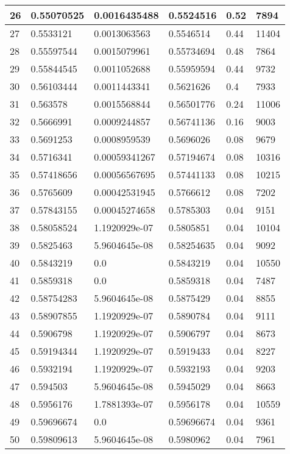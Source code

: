 \begin{longtable}{|l|l|l|l|l|l|}
26 & 0.55070525 & 0.0016435488 & 0.5524516 & 0.52 & 7894 \\ \hline 
27 & 0.5533121 & 0.0013063563 & 0.5546514 & 0.44 & 11404 \\ \hline 
28 & 0.55597544 & 0.0015079961 & 0.55734694 & 0.48 & 7864 \\ \hline 
29 & 0.55844545 & 0.0011052688 & 0.55959594 & 0.44 & 9732 \\ \hline 
30 & 0.56103444 & 0.0011443341 & 0.5621626 & 0.4 & 7933 \\ \hline 
31 & 0.563578 & 0.0015568844 & 0.56501776 & 0.24 & 11006 \\ \hline 
32 & 0.5666991 & 0.0009244857 & 0.56741136 & 0.16 & 9003 \\ \hline 
33 & 0.5691253 & 0.0008959539 & 0.5696026 & 0.08 & 9679 \\ \hline 
34 & 0.5716341 & 0.00059341267 & 0.57194674 & 0.08 & 10316 \\ \hline 
35 & 0.57418656 & 0.00056567695 & 0.57441133 & 0.08 & 10215 \\ \hline 
36 & 0.5765609 & 0.00042531945 & 0.5766612 & 0.08 & 7202 \\ \hline 
37 & 0.57843155 & 0.00045274658 & 0.5785303 & 0.04 & 9151 \\ \hline 
38 & 0.58058524 & 1.1920929e-07 & 0.5805851 & 0.04 & 10104 \\ \hline 
39 & 0.5825463 & 5.9604645e-08 & 0.58254635 & 0.04 & 9092 \\ \hline 
40 & 0.5843219 & 0.0 & 0.5843219 & 0.04 & 10550 \\ \hline 
41 & 0.5859318 & 0.0 & 0.5859318 & 0.04 & 7487 \\ \hline 
42 & 0.58754283 & 5.9604645e-08 & 0.5875429 & 0.04 & 8855 \\ \hline 
43 & 0.58907855 & 1.1920929e-07 & 0.5890784 & 0.04 & 9111 \\ \hline 
44 & 0.5906798 & 1.1920929e-07 & 0.5906797 & 0.04 & 8673 \\ \hline 
45 & 0.59194344 & 1.1920929e-07 & 0.5919433 & 0.04 & 8227 \\ \hline 
46 & 0.5932194 & 1.1920929e-07 & 0.5932193 & 0.04 & 9203 \\ \hline 
47 & 0.594503 & 5.9604645e-08 & 0.5945029 & 0.04 & 8663 \\ \hline 
48 & 0.5956176 & 1.7881393e-07 & 0.5956178 & 0.04 & 10559 \\ \hline 
49 & 0.59696674 & 0.0 & 0.59696674 & 0.04 & 9361 \\ \hline 
50 & 0.59809613 & 5.9604645e-08 & 0.5980962 & 0.04 & 7961 \\ \hline 

\end{longtable}
